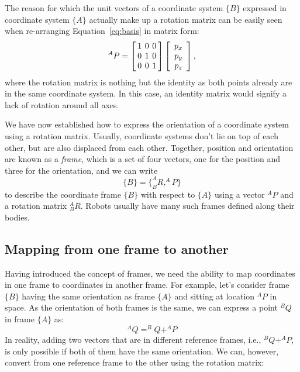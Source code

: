 The reason for which the unit vectors of a coordinate system $\{B\}$ expressed in coordinate system $\{A\}$ actually make up a rotation matrix can be easily seen when re-arranging Equation~\ref{eq:basis} in matrix form:
\begin{equation}
^AP=\left[ \arraycolsep=2pt%
\begin{array}{ccc}1 & 0 & 0\\0 & 1 & 0\\0 & 0 & 1\end{array}\right]\left[\begin{array}{c}p_x\\p_y\\p_z\end{array}
\right],
\end{equation}
where the rotation matrix is nothing but the identity as both points already are in the same coordinate system. In this case, an identity matrix would signify a lack of rotation around all axes.

We have now established how to express the orientation of a coordinate system using a rotation matrix. Usually, coordinate systems don't lie on top of each other, but are also displaced from each other.
Together, position and orientation are known as a \emph{frame}, which is a set of four vectors, one for the position and three for the orientation, and we can write
%
\begin{equation}
\{B\}=\{^A_BR, ^AP\}
\end{equation}
%
to describe the coordinate frame $\{B\}$ with respect to $\{A\}$ using a vector $^AP$ and a rotation matrix $^A_BR$. Robots usually have many such frames defined along their bodies.

\subsection{Mapping from one frame to another}


Having introduced the concept of frames, we need the ability to map coordinates in one frame to coordinates in another frame. For example, let's consider frame $\{B\}$ having the same orientation as frame $\{A\}$ and sitting at location $^AP$ in space. As the orientation of both frames is the same, we can express a point $ ^BQ$ in frame $\{A\}$ as:
%
\begin{equation}
^AQ=^BQ+^AP
\end{equation}
%
In reality, adding two vectors that are in different reference frames, i.e., $ ^BQ+^AP$, is only possible if both of them have the same orientation. We can, however, convert from one reference frame to the other using the rotation matrix:

